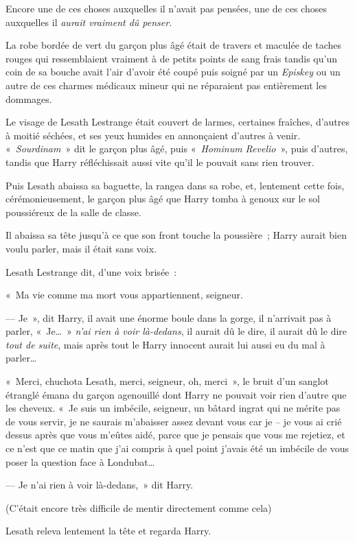 Encore une de ces choses auxquelles il n'avait pas pensées, une de ces choses auxquelles il \emph{aurait vraiment dû penser}.

La robe bordée de vert du garçon plus âgé était de travers et maculée de taches rouges qui ressemblaient vraiment à de petits points de sang frais tandis qu'un coin de sa bouche avait l'air d'avoir été coupé puis soigné par un \emph{Episkey} ou un autre de ces charmes médicaux mineur qui ne réparaient pas entièrement les dommages.

Le visage de Lesath Lestrange était couvert de larmes, certaines fraîches, d'autres à moitié séchées, et ses yeux humides en annonçaient d'autres à venir. «~\emph{Sourdinam}~» dit le garçon plus âgé, puis «~\emph{Hominum Revelio}~», puis d'autres, tandis que Harry réfléchissait aussi vite qu'il le pouvait sans rien trouver.

Puis Lesath abaissa sa baguette, la rangea dans sa robe, et, lentement cette fois, cérémonieusement, le garçon plus âgé que Harry tomba à genoux sur le sol poussiéreux de la salle de classe.

Il abaissa sa tête jusqu'à ce que son front touche la poussière~; Harry aurait bien voulu parler, mais il était sans voix.

Lesath Lestrange dit, d'une voix brisée~:

«~Ma vie comme ma mort vous appartiennent, seigneur.

--- Je~», dit Harry, il avait une énorme boule dans la gorge, il n'arrivait pas à parler, «~Je…~» \emph{n'ai rien à voir là-dedans}, il aurait dû le dire, il aurait dû le dire \emph{tout de suite}, mais après tout le Harry innocent aurait lui aussi eu du mal à parler…

«~Merci, chuchota Lesath, merci, seigneur, oh, merci~», le bruit d'un sanglot étranglé émana du garçon agenouillé dont Harry ne pouvait voir rien d'autre que les cheveux. «~Je suis un imbécile, seigneur, un bâtard ingrat qui ne mérite pas de vous servir, je ne saurais m'abaisser assez devant vous car je -- je vous ai crié dessus après que vous m'eûtes aidé, parce que je pensais que vous me rejetiez, et ce n'est que ce matin que j'ai compris à quel point j'avais été un imbécile de vous poser la question face à Londubat…

--- Je n'ai rien à voir là-dedans,~» dit Harry.

(C'était encore très difficile de mentir directement comme cela)

Lesath releva lentement la tête et regarda Harry.

